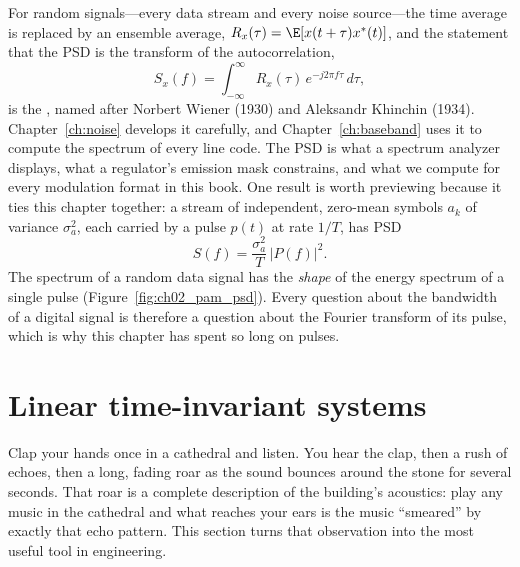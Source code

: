 For random signals---every data stream and every noise source---the time average is replaced by
an ensemble average, $R_x(\tau)=\E[x(t+\tau)x^*(t)]$, and the statement that the PSD is the
transform of the autocorrelation,
\begin{equation}
S_x(f)=\int_{-\infty}^{\infty}R_x(\tau)\,e^{-j2\pi f\tau}\,d\tau,
\label{eq:ch02:wk}
\end{equation}
is the , named after Norbert Wiener (1930) and Aleksandr Khinchin
(1934). Chapter~\ref{ch:noise} develops it carefully, and Chapter~\ref{ch:baseband} uses it to
compute the spectrum of every line code. The PSD is what a spectrum analyzer displays, what a
regulator's emission mask constrains, and what we compute for every modulation format in this
book. One result is worth previewing because it ties this chapter together: a stream of
independent, zero-mean symbols $a_k$ of variance $\sigma_a^2$, each carried by a pulse $p(t)$ at
rate $1/T$, has PSD
\begin{equation}
S(f)=\frac{\sigma_a^2}{T}\,|P(f)|^2 .
\label{eq:ch02:pampsd}
\end{equation}
The spectrum of a random data signal has the \emph{shape} of the energy spectrum of a single pulse
(Figure~\ref{fig:ch02_pam_psd}). Every question about the bandwidth of a digital signal is therefore
a question about the Fourier transform of its pulse, which is why this chapter has spent so long on
pulses.

\section{Linear time-invariant systems}
\label{sec:lti}

Clap your hands once in a cathedral and listen. You hear the clap, then a rush of echoes, then a
long, fading roar as the sound bounces around the stone for several seconds. That roar is a complete
description of the building's acoustics: play any music in the cathedral and what reaches your ears
is the music ``smeared'' by exactly that echo pattern. This section turns that observation into the
most useful tool in engineering.



